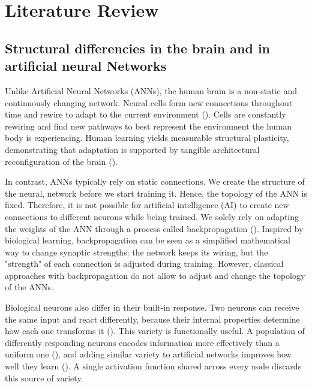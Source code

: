 \documentclass[12pt]{article}
\begin{document}
\section{Literature Review}


\subsection{Structural differencies in the brain and in artificial neural Networks}


Unlike Artificial Neural Networks (ANNs), the human brain is a non-static and continuously changing network. Neural cells form new connections throughout time and rewire to adapt to the current environment (\cite{pascualleone_plastic_2005,holtmaat_experience-dependent_2009}). Cells are constantly rewiring and find new pathways to best represent the environment the human body is experiencing. Human learning yields measurable structural plasticity, demonstrating that adaptation is supported by tangible architectural reconfiguration of the brain (\cite{draganski_changes_2004}).

In contrast, ANNs typically rely on static connections. We create the structure of the neural, network before we start training it. Hence, the topology of the ANN is fixed. Therefore, it is not possible for artificial intelligence (AI) to create new connections to different neurons while being trained. We solely rely on adapting the weights of the ANN through a process called backpropagation (\cite{rumelhart_learning_1986}). Inspired by biological learning, backpropagation can be seen as a simplified mathematical way to change synaptic strengths: the network keeps its wiring, but the "strength" of each connection is adjusted during training. However, classical approaches with backpropagation do not allow to adjust and change the topology of the ANNs.

Biological neurons also differ in their built-in response. 
Two neurons can receive the same input and react differently, because their internal properties determine how each one transforms it (\cite{drion_ion_2015}). 
This variety is functionally useful. A population of differently responding neurons encodes information more effectively than a uniform one (\cite{tripathy_intermediate_2013}), and adding similar variety to artificial networks improves how well they learn (\cite{perez-nieves_neural_2021}). A single activation function shared across every node discards this source of variety.
\end{document}
